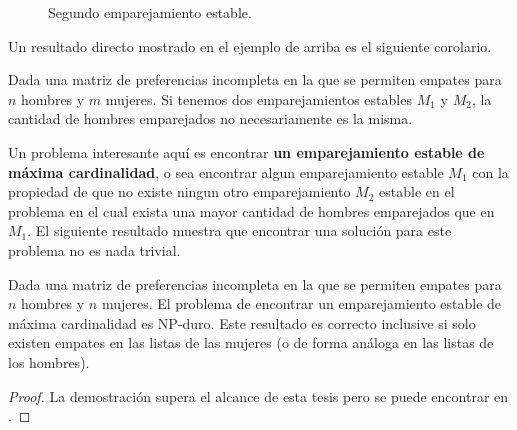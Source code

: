 \begin{eje}{\cite{empates}}
\begin{figure}[H]

\caption{Segundo emparejamiento estable.}
\end{figure}
\end{eje}

Un resultado directo mostrado en el ejemplo de arriba es el siguiente corolario.

\begin{cor}
Dada una matriz de preferencias incompleta en la que se permiten empates para $n$ hombres y $m$ mujeres. Si tenemos dos emparejamientos estables $M_1$ y $M_2$, la cantidad de hombres emparejados no necesariamente es la misma.
\end{cor}

Un problema interesante aquí es encontrar \textbf{un emparejamiento estable de máxima cardinalidad}, o sea encontrar algun emparejamiento estable $M_1$ con la propiedad de que no existe ningun otro emparejamiento $M_2$ estable en el problema en el cual exista una mayor cantidad de hombres emparejados que en $M_1$.  El siguiente resultado muestra que encontrar una solución para este problema no es nada trivial.

\begin{teo} {\cite{empates}} \label{NPempates}
Dada una matriz de preferencias incompleta en la que se permiten empates para $n$ hombres y $n$ mujeres. El problema de encontrar un emparejamiento estable de máxima cardinalidad es NP-duro. Este resultado es correcto inclusive si solo existen empates en las listas de las mujeres (o de forma análoga en las listas de los hombres). 
\end{teo}
\begin{proof}
La demostración supera el alcance de esta tesis pero se puede encontrar en \cite{empates}. 
\end{proof}














